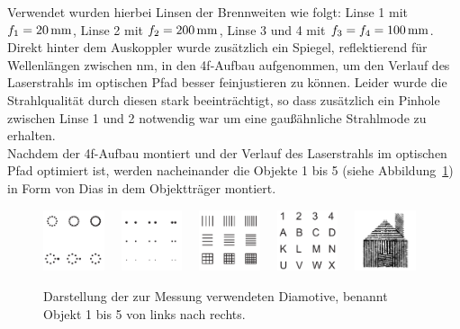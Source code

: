 Verwendet wurden hierbei Linsen der Brennweiten wie folgt: Linse 1 mit $f_{1}=\unit[20]{mm}$, Linse 2 mit $f_{2}=\unit[200]{mm}$, Linse 3 und 4 mit $f_{3}=f_{4}=\unit[100]{mm}$. Direkt hinter dem Auskoppler wurde zusätzlich ein Spiegel, reflektierend für Wellenlängen zwischen \unit[400-700]{nm}, in den 4f-Aufbau aufgenommen, um den Verlauf des Laserstrahls im optischen Pfad besser feinjustieren zu können. Leider wurde die Strahlqualität durch diesen stark beeinträchtigt, so dass zusätzlich ein Pinhole zwischen Linse 1 und 2 notwendig war um eine gaußähnliche Strahlmode zu erhalten.\\ %

Nachdem der 4f-Aufbau montiert und der Verlauf des Laserstrahls im optischen Pfad optimiert ist, werden nacheinander die Objekte 1 bis 5 (siehe Abbildung~\ref{fig:Objekte-aus-Anleitungsheft}) in Form von Dias in dem Objektträger montiert.

\begin{figure}
	\centering
	\includegraphics[width=0.16\textwidth]{images/Anleitungsheft/objekt1.png}~~
	\includegraphics[width=0.16\textwidth]{images/Anleitungsheft/objekt2.png}~~
	\includegraphics[width=0.16\textwidth]{images/Anleitungsheft/objekt3.png}~~
	\includegraphics[width=0.16\textwidth]{images/Anleitungsheft/objekt4.png}~~
	\includegraphics[width=0.16\textwidth]{images/Anleitungsheft/objekt5.png}
	\caption[Die zur Messung verwendeten Diamotive]{
		Darstellung der zur Messung verwendeten Diamotive, benannt Objekt 1 bis 5 von links nach rechts.
	}
\label{fig:Objekte-aus-Anleitungsheft}
\end{figure}

